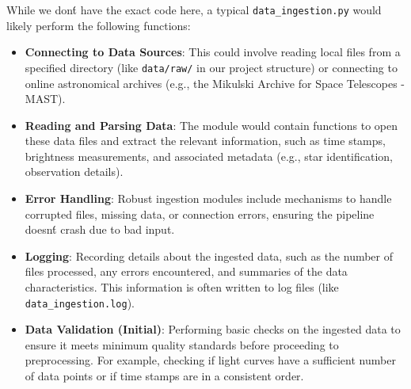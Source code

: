 \documentclass{article}
\begin{document}
While we don\'t have the exact code here, a typical \texttt{data\_ingestion.py} would likely perform the following functions:

\begin{itemize}
    \item \textbf{Connecting to Data Sources}: This could involve reading local files from a specified directory (like \texttt{data/raw/} in our project structure) or connecting to online astronomical archives (e.g., the Mikulski Archive for Space Telescopes - MAST).

    \item \textbf{Reading and Parsing Data}: The module would contain functions to open these data files and extract the relevant information, such as time stamps, brightness measurements, and associated metadata (e.g., star identification, observation details).

    \item \textbf{Error Handling}: Robust ingestion modules include mechanisms to handle corrupted files, missing data, or connection errors, ensuring the pipeline doesn\'t crash due to bad input.

    \item \textbf{Logging}: Recording details about the ingested data, such as the number of files processed, any errors encountered, and summaries of the data characteristics. This information is often written to log files (like \texttt{data\_ingestion.log}).

    \item \textbf{Data Validation (Initial)}: Performing basic checks on the ingested data to ensure it meets minimum quality standards before proceeding to preprocessing. For example, checking if light curves have a sufficient number of data points or if time stamps are in a consistent order.
\end{itemize}
\end{document}
